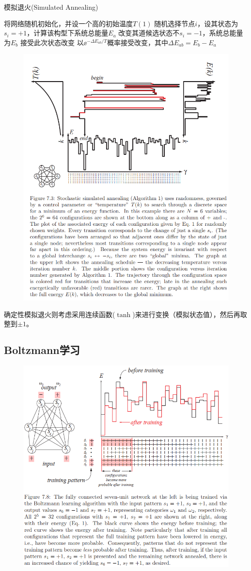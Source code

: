 \begin{algorithm}[H]
\caption{模拟退火(Simulated Annealing)}
\begin{algorithmic}[2]
\State 将网络随机初始化，并设一个高的初始温度$T(1)$
\State 随机选择节点$i$，设其状态为$s_i=+1$，计算该构型下系统总能量$E_a$
\State 改变其道候选状态不$s_i=-1$，系统总能量为$E_b$
\State 接受此次状态改变
\Else
\State 以$\ee^{-\Delta E_{ab}/T}$概率接受改变，其中$\Delta E_{ab}=E_b-E_a$
\EndIf
\end{algorithmic}
\end{algorithm}
\begin{figure}[H]
\centering
\includegraphics[width=0.8\linewidth]{fig/simulated_annealing.png}
\end{figure}

确定性模拟退火则考虑采用连续函数($\tanh$)来进行变换（模拟状态值），然后再取整到$\pm 1$。

\subsection{Boltzmann学习} %
\begin{figure}[H]
\centering
\includegraphics[width=0.8\linewidth]{fig/boltzmann_learning.png}
\end{figure}


